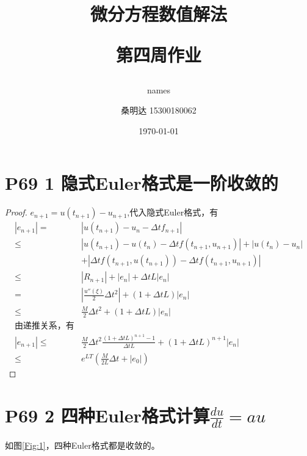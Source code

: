 \documentclass{article}%
\author{names}
\title{\heiti 微分方程数值解法\\ [2ex] \begin{large} 第四周作业 \end{large}}
\author{\kaishu 桑明达 15300180062}
\date{\today}
\begin{document}
\maketitle


\section{P69 1 隐式Euler格式是一阶收敛的}

\begin{proof}
	$ e_{n+1}=u(t_{n+1})-u_{n+1} $,代入隐式Euler格式，有
\begin{align*}
	\left| e_{n+1} \right| = & \left| u(t_{n+1}) - u_n - \Delta t f_{n+1} \right| \\
	 \leq & \left| u(t_{n+1}) - u(t_n) - \Delta t f(t_{n+1},u_{n+1}) \right| + \left| u(t_{n}) - u_n  \right| \\
	& + \left| \Delta t f(t_{n+1},u(t_{n+1})) - \Delta t f(t_{n+1},u_{n+1}) \right| \\
	\leq & \left| R_{n+1} \right| + \left| e_{n}  \right| + \Delta t L \left| e_{n}  \right| \\
	= & \left | \frac{u'' (\xi)}{2}\Delta t^2 \right | + (1+\Delta t L) \left| e_{n}  \right| \\
	\leq  &\frac{M}{2}\Delta t^2  + (1+\Delta t L) \left| e_{n}  \right| \\
	\text{由递推关系，有} \\
	\left| e_{n+1} \right| \leq & \frac{M}{2} \Delta t^2 \frac{(1+\Delta tL)^{n+1}-1}{\Delta t L} + (1+\Delta t L)^{n+1} \left| e_{n}  \right| \\
	\leq & e^{LT}(\frac{M}{2L}\Delta t + \left| e_{0}  \right|  ) 
\end{align*}
\end{proof}

\section{P69 2 四种Euler格式计算$\frac{du}{dt} = au$}

如图\ref{Fig:1}，四种Euler格式都是收敛的。
  
\end{document}

